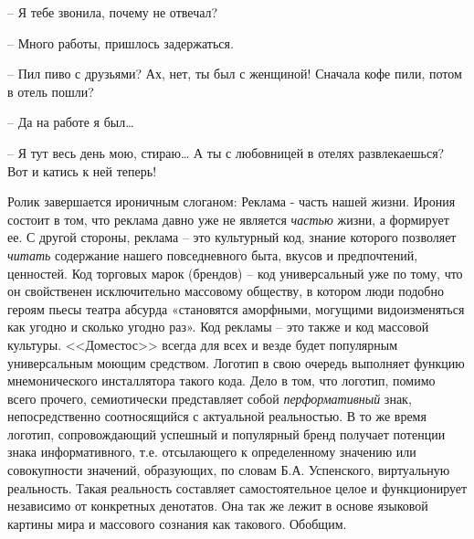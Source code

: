 -- Я тебе звонила, почему не отвечал?

-- Много работы, пришлось задержаться.

-- Пил пиво с друзьями? Ах, нет, ты был с женщиной! Сначала кофе пили, потом в отель пошли?

-- Да на работе я был…

-- Я тут весь день мою, стираю… А ты с любовницей в отелях развлекаешься? Вот и катись к ней теперь!

Ролик завершается ироничным слоганом: Реклама - часть нашей жизни. Ирония состоит в том, что реклама давно уже не является \emph{частью} жизни, а формирует ее. С другой стороны, реклама – это культурный код, знание которого позволяет \emph{читать} содержание нашего повседневного быта, вкусов и предпочтений, ценностей. Код торговых марок (брендов) – код универсальный уже по тому, что он свойственен исключительно массовому обществу, в котором люди подобно героям пьесы театра абсурда «становятся аморфными, могущими видоизменяться как угодно и сколько угодно раз».\autocite[][75]{edoshina2002} Код рекламы – это также и код массовой культуры. <<Доместос>> всегда для всех и везде будет популярным универсальным моющим средством. Логотип в свою очередь выполняет функцию мнемонического инсталлятора такого кода. Дело в том, что логотип, помимо всего прочего, семиотически представляет собой \emph{перформативный} знак, непосредственно соотносящийся с актуальной реальностью. В то же время логотип, сопровождающий успешный и популярный бренд получает потенции знака информативного, т.е. отсылающего к определенному значению или совокупности значений, образующих, по словам Б.А. Успенского, виртуальную реальность.\autocite[][9]{uspenski2007} Такая реальность составляет самостоятельное целое и функционирует независимо от конкретных денотатов. Она так же лежит в основе языковой картины мира и массового сознания как такового.
Обобщим.

